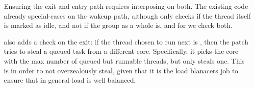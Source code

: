 Ensuring the exit and entry path requires interposing on both. The existing code
already special-cases on the wakeup path, although only checks if the thread
itself is marked as idle, and not if the group as a whole is, and for \schedbe{}
we check both.

\schedbe{} also adds a check on the exit: if the thread chosen to run next is
\schedbe{}, then the patch tries to steal a queued \schednormal{} task from a
different core. Specifically, it picks the core with the max number of queued
but runnable \schednormal{} threads, but only steals one. This is in order to
not overzealously steal, given that it is the load blanacers job to ensure that
in general load is well balanced.